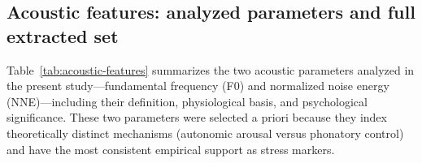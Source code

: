 \documentclass[
  english,
  man,floatsintext]{apa6}
\begin{document}
\begin{table}[!h]
\centering
\caption{\label{tab:table-s-mc-contrasts}Bayesian manipulation-check contrasts. CrIs are 89\% equal-tailed intervals and are not used as significance tests.}
\centering
{}
\end{table}

\subsection{Acoustic features: analyzed parameters and full extracted set}\label{acoustic-features-analyzed-parameters-and-full-extracted-set}

Table~\ref{tab:acoustic-features} summarizes the two acoustic parameters analyzed in the present study---fundamental frequency (F0) and normalized noise energy (NNE)---including their definition, physiological basis, and psychological significance. These two parameters were selected a priori because they index theoretically distinct mechanisms (autonomic arousal versus phonatory control) and have the most consistent empirical support as stress markers.
\end{document}
